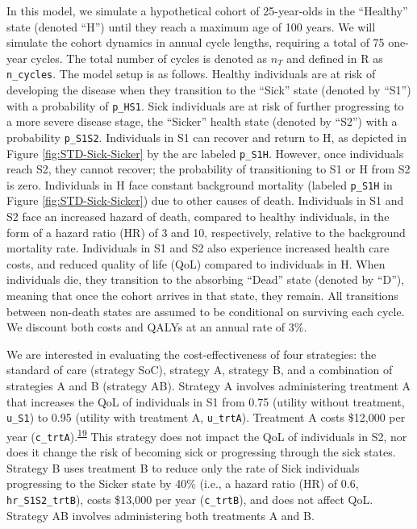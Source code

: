\documentclass[
]{article}
\begin{document}
In this model, we simulate a hypothetical cohort of 25-year-olds in the ``Healthy'' state (denoted ``H'') until they reach a maximum age of 100 years. We will simulate the cohort dynamics in annual cycle lengths, requiring a total of 75 one-year cycles. The total number of cycles is denoted as \(n_T\) and defined in R as \texttt{n\_cycles}. The model setup is as follows. Healthy individuals are at risk of developing the disease when they transition to the ``Sick'' state (denoted by ``S1'') with a probability of \texttt{p\_HS1}. Sick individuals are at risk of further progressing to a more severe disease stage, the ``Sicker'' health state (denoted by ``S2'') with a probability \texttt{p\_S1S2}. Individuals in S1 can recover and return to H, as depicted in Figure \ref{fig:STD-Sick-Sicker} by the arc labeled \texttt{p\_S1H}. However, once individuals reach S2, they cannot recover; the probability of transitioning to S1 or H from S2 is zero. Individuals in H face constant background mortality (labeled \texttt{p\_S1H} in Figure \ref{fig:STD-Sick-Sicker}) due to other causes of death. Individuals in S1 and S2 face an increased hazard of death, compared to healthy individuals, in the form of a hazard ratio (HR) of 3 and 10, respectively, relative to the background mortality rate. Individuals in S1 and S2 also experience increased health care costs, and reduced quality of life (QoL) compared to individuals in H. When individuals die, they transition to the absorbing ``Dead'' state (denoted by ``D''), meaning that once the cohort arrives in that state, they remain. All transitions between non-death states are assumed to be conditional on surviving each cycle. We discount both costs and QALYs at an annual rate of 3\%.

We are interested in evaluating the cost-effectiveness of four strategies: the standard of care (strategy SoC), strategy A, strategy B, and a combination of strategies A and B (strategy AB). Strategy A involves administering treatment A that increases the QoL of individuals in S1 from 0.75 (utility without treatment, \texttt{u\_S1}) to 0.95 (utility with treatment A, \texttt{u\_trtA}). Treatment A costs \$12,000 per year (\texttt{c\_trtA}).\textsuperscript{\protect\hyperlink{ref-Krijkamp2018}{19}} This strategy does not impact the QoL of individuals in S2, nor does it change the risk of becoming sick or progressing through the sick states. Strategy B uses treatment B to reduce only the rate of Sick individuals progressing to the Sicker state by 40\% (i.e., a hazard ratio (HR) of 0.6, \texttt{hr\_S1S2\_trtB}), costs \$13,000 per year (\texttt{c\_trtB}), and does not affect QoL. Strategy AB involves administering both treatments A and B.
\end{document}
